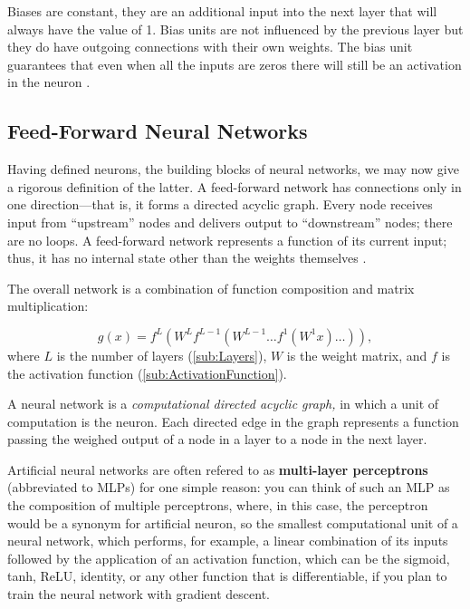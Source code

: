 \documentclass[nobib]{tufte-handout} %
\begin{document}
\begin{definition}[Bias]\label{def:bias}
  Biases are constant, they are an additional input into the next layer that will always have the value of 1. Bias units are not influenced by the previous layer but they do have outgoing connections with their own weights. The bias unit guarantees that even when all the inputs are zeros there will still be an activation in the neuron \citep{WeightsBias}. 
\end{definition}
\subsection{Feed-Forward Neural Networks}%
  \label{sub:Feed-Forward Neural Networks}
  Having defined neurons, the building blocks of neural networks, we may now give a rigorous definition of the latter. A feed-forward network has connections only in one direction—that is, it forms a directed acyclic graph. Every node receives input from “upstream” nodes and delivers output to “downstream” nodes; there are no loops. A feed-forward network represents a function of its current input; thus, it has no internal state other than the weights themselves \citep{book:AIModernApp}.

The overall network is a combination of function composition and matrix multiplication:

  $$g(x) = f^L (W^Lf^{L-1}(W^{L-1} \hdots f^1(W^1x)\hdots)), $$
  where $L$ is the number of layers (\autoref{sub:Layers}), $W$ is the weight matrix, and $f$ is the activation function (\ref{sub:ActivationFunction}).
 \begin{definition}
  A neural network is a \textit{computational directed acyclic graph,} in which a unit of computation is the neuron. Each directed edge in the graph represents a function passing the weighed output of a node in a layer to a node in the next layer.
 \end{definition} 

   Artificial neural networks are often refered to as \textbf{multi-layer perceptrons} (abbreviated to MLPs) for one simple reason: you can think of such an MLP as the composition of multiple perceptrons, where, in this case, the perceptron would be a synonym for artificial neuron, so the smallest computational unit of a neural network, which performs, for example, a linear combination of its inputs followed by the application of an activation function, which can be the sigmoid, tanh, ReLU, identity, or any other function that is differentiable, if you plan to train the neural network with gradient descent.
\end{document}
